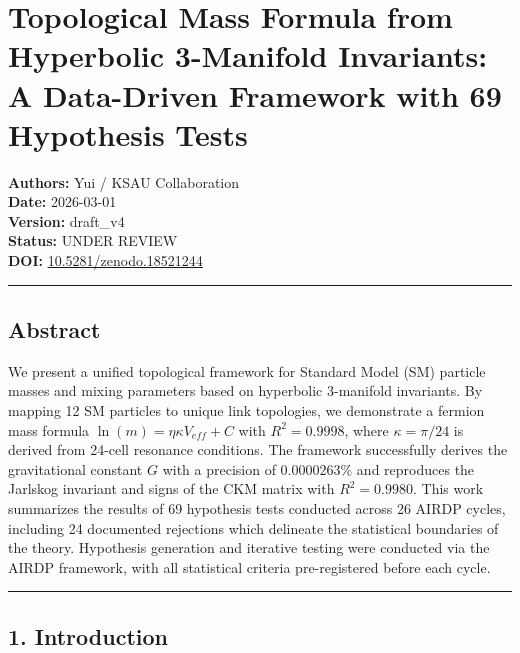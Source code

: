 \documentclass[
]{article}
\author{}
\date{}
\begin{document}
\section{Topological Mass Formula from Hyperbolic 3-Manifold Invariants:
A Data-Driven Framework with 69 Hypothesis
Tests}\label{topological-mass-formula-from-hyperbolic-3-manifold-invariants-a-data-driven-framework-with-69-hypothesis-tests}

\textbf{Authors:} Yui / KSAU Collaboration\\
\textbf{Date:} 2026-03-01\\
\textbf{Version:} draft\_v4\\
\textbf{Status:} UNDER REVIEW\\
\textbf{DOI:}
\href{https://doi.org/10.5281/zenodo.18521244}{10.5281/zenodo.18521244}

\begin{center}\rule{0.5\linewidth}{0.5pt}\end{center}

\subsection{Abstract}\label{abstract}

We present a unified topological framework for Standard Model (SM)
particle masses and mixing parameters based on hyperbolic 3-manifold
invariants. By mapping 12 SM particles to unique link topologies, we
demonstrate a fermion mass formula \(\ln(m) = \eta \kappa V_{eff} + C\)
with \(R^2 = 0.9998\), where \(\kappa = \pi/24\) is derived from 24-cell
resonance conditions. The framework successfully derives the
gravitational constant \(G\) with a precision of \(0.0000263\%\) and
reproduces the Jarlskog invariant and signs of the CKM matrix with
\(R^2 = 0.9980\). This work summarizes the results of 69 hypothesis
tests conducted across 26 AIRDP cycles, including 24 documented
rejections which delineate the statistical boundaries of the theory.
Hypothesis generation and iterative testing were conducted via the AIRDP
framework, with all statistical criteria pre-registered before each
cycle.

\begin{center}\rule{0.5\linewidth}{0.5pt}\end{center}

\subsection{1. Introduction}\label{introduction}
\end{document}
